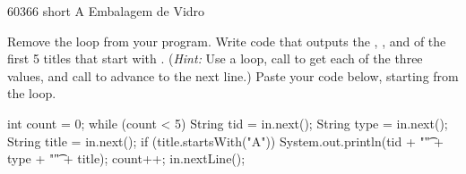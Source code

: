 \begin{answer}
\begin{javaans}
60366
short
A Embalagem de Vidro
\end{javaans}
\end{answer}
        
\Q \label{key2}
Remove the  loop from your program.
Write code that outputs the , , and  of the first 5 titles that start with .
(\textit{Hint:} Use a  loop, call  to get each of the three values, and call  to advance to the next line.)
Paste your code below, starting from the  loop.

\begin{answer}[15em]
\begin{javaans}
int count = 0;
while (count < 5) {
    String tid = in.next();
    String type = in.next();
    String title = in.next();
    if (title.startsWith("A")) {
        System.out.println(tid + "\t" + type + "\t" + title);
        count++;
    }
    in.nextLine();
}
\end{javaans}
\end{answer}
